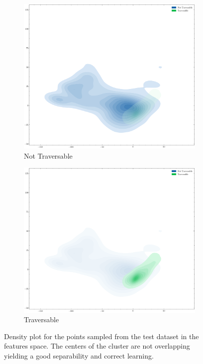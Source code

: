 \documentclass[../document.tex]{subfiles}
\begin{document}
\begin{figure} [htbp]
\begin{subfigure}[b]{0.48\textwidth}
    \includegraphics[width=\linewidth]{../img/5/pca/pca-test-0-density.png}
    \caption{Not Traversable}
\end{subfigure}
\begin{subfigure}[b]{0.48\textwidth}
    \includegraphics[width=\linewidth]{../img/5/pca/pca-test-1-density.png}
    \caption{Traversable}
    \label{fig : pca-test-density-1}
\end{subfigure}
\caption{Density plot for the points sampled from the test dataset in the features space. The centers of the cluster are not overlapping yielding a good separability and correct learning.}
\end{figure}
\end{document}
